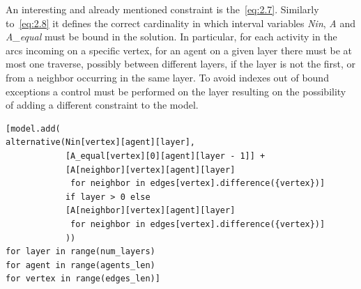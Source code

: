 \documentclass[12pt, a4paper, hidelinks]{article}
\numberwithin{equation}{section}
\begin{document}
An interesting and already mentioned constraint is the~\ref{eq:2.7}.
Similarly to~\ref{eq:2.8} it defines the correct cardinality in which interval variables \textit{Nin}, \textit{A} and \textit{A\_equal} must be bound in the solution.
In particular, for each activity in the arcs incoming on a specific vertex, for an agent on a given layer there must be at most one traverse, possibly between different layers, if the layer is not the first, or from a neighbor occurring in the same layer.
To avoid indexes out of bound exceptions a control must be performed on the layer resulting on the possibility of adding a different constraint to the model.

\begin{lstlisting}[label={lst:eq2.7}]
[model.add(
alternative(Nin[vertex][agent][layer],
            [A_equal[vertex][0][agent][layer - 1]] +
            [A[neighbor][vertex][agent][layer]
             for neighbor in edges[vertex].difference({vertex})]
            if layer > 0 else
            [A[neighbor][vertex][agent][layer]
             for neighbor in edges[vertex].difference({vertex})]
            ))
for layer in range(num_layers)
for agent in range(agents_len)
for vertex in range(edges_len)]
\end{lstlisting}
\end{document}
